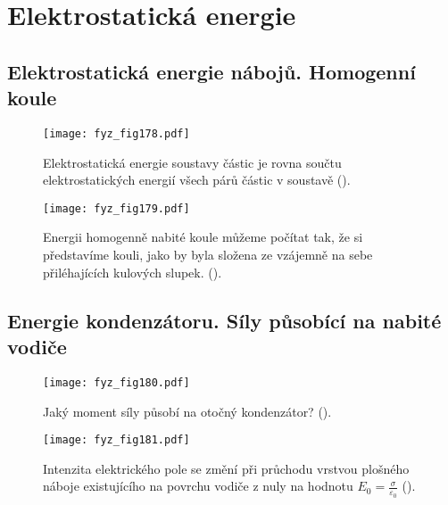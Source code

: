 {
\chapter{Elektrostatická energie}\label{fyz:IIchapVI}
\minitoc


\section{Elektrostatická energie nábojů. Homogenní koule}\label{fyz:IIchapVIsecI}

  \begin{figure}[ht!]  %
    \centering
    \texttt{[image: fyz\_fig178.pdf]}
    \caption{Elektrostatická energie soustavy částic je rovna součtu elektrostatických energií 
             všech párů částic v soustavě
             (\cite[s.~140]{Feynman02}).}
    \label{fyz:fig178}
  \end{figure}
  
  \begin{figure}[ht!]  %
    \centering
    \texttt{[image: fyz\_fig179.pdf]}
    \caption{Energii homogenně nabité koule můžeme počítat tak, že si představíme kouli, jako by 
             byla složena ze vzájemně na sebe přiléhajících kulových slupek. 
             (\cite[s.~141]{Feynman02}).}
    \label{fyz:fig179}
  \end{figure}

\section{Energie kondenzátoru. Síly působící na nabité vodiče}\label{fyz:IIchapVIsecII}

  \begin{figure}[ht!]  %
    \centering
    \texttt{[image: fyz\_fig180.pdf]}
    \caption{Jaký moment síly působí na otočný kondenzátor?
             (\cite[s.~144]{Feynman02}).}
    \label{fyz:fig180}
  \end{figure}
  
  \begin{figure}[ht!]  %
    \centering
    \texttt{[image: fyz\_fig181.pdf]}
    \caption{Intenzita elektrického pole se změní při průchodu vrstvou plošného náboje existujícího 
             na povrchu vodiče z nuly na hodnotu \(E_0 = \frac{\sigma}{\varepsilon_0}\)
             (\cite[s.~145]{Feynman02}).}
    \label{fyz:fig181}
  \end{figure}
  
}
